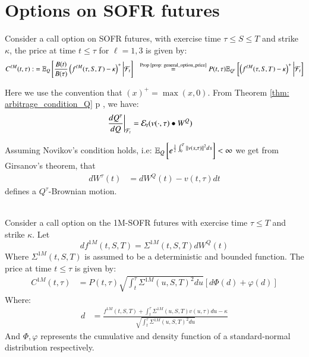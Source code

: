 \newpage 

\section{Options on SOFR futures}

Consider a call option on SOFR futures, with exercise time $\tau \leq S \leq T$ and strike $\kappa$, the price at time $t \leq \tau$ for $\ell =1,3$ is given by:
\begin{align*}
C^{\ell M}(t,\tau) :&= \mathbb{E}_{Q}\left[
\frac{B(t)}{B(\tau)}\left(
f^{\ell M}(\tau,S,T) - \kappa
\right)^{+}
\bigg{|}\mathcal{F}_{t}
\right]  
&\stackrel{\text{Prop \ref{prop: general_option_price}}}{=} 
P(t,\tau)\mathbb{E}_{Q^{\tau}}\left[
\left(f^{\ell M}(\tau,S,T) - \kappa
\right)^{+}
\bigg{|}\mathcal{F}_{t}
\right]
\end{align*} 

Here we use the convention that $(x)^{+} = \max(x,0)$. From Theorem \ref{thm: arbitrage_condition_Q} p \pageref{thm: arbitrage_condition_Q}, we have: 
\begin{align*}
\frac{dQ^{\tau}}{dQ}\bigg{|}_{\mathcal{F}_{t}} &= \mathcal{E}_{t}(v(\cdot, \tau)\bullet W^{Q})
\end{align*} 

Assuming Novikov's condition holds, i.e: $\mathbb{E}_{Q}\left[e^{\frac{1}{2}\int_{0}^{T}\norm{v(s,\tau)}^{2}ds}\right] < \infty$ we get from Girsanov's theorem, that
\begin{align*}
dW^{\tau}(t) &= dW^{Q}(t) - v(t,\tau)dt    
\end{align*}
defines a $Q^{\tau}$-Brownian motion. 
\\~\\ 
\begin{proposition}
Consider a call option on the 1M-SOFR futures with exercise time $\tau \leq T$ and strike $\kappa$. Let 
\[
df^{1M}(t,S,T) = \Sigma^{1M}(t,S,T)dW^{Q}(t)  
\]
Where $\Sigma^{1M}(t,S,T)$ is assumed to be a deterministic and bounded function. The price at time $t\leq \tau$ is given by: 
\begin{align*}
C^{1M}(t,\tau) &= 
P(t,\tau)\sqrt{
\int_{t}^{\tau}\Sigma^{1M}(u,S,T)^{2}du
}\left[
d\Phi(d) + \varphi(d)
\right]
\end{align*}
Where: 
\begin{align*}
d &= 
\frac{
f^{1M}(t,S,T) + \int_{t}^{\tau}\Sigma^{1M}(u,S,T)v(u,\tau)du - \kappa
}{
\sqrt{
\int_{t}^{\tau}\Sigma^{1M}(u,S,T)^{2}du
}
}
\end{align*}
And $\Phi, \varphi$ represents the cumulative and density function of a standard-normal distribution respectively. 
\end{proposition}

